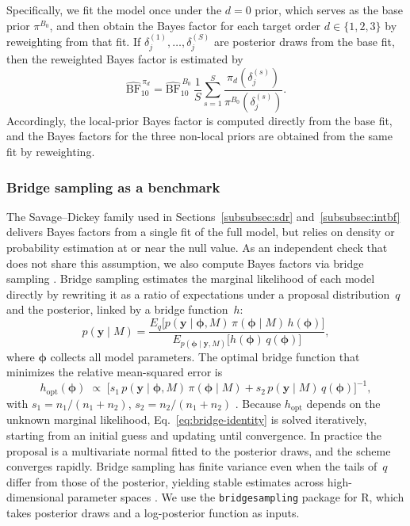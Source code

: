 \documentclass{article}
\begin{document}
Specifically, we fit the model once under the $d=0$ prior, which serves
as the base prior $\pi^{B_0}$, and then obtain the Bayes factor for each
target order $d \in \{1,2,3\}$ by reweighting from that fit. If
$\delta_j^{(1)},\dots,\delta_j^{(S)}$ are posterior draws from the base
fit, then the reweighted Bayes factor is estimated by
%
\begin{equation}
\label{eq:reweighting-estimator}
\widehat{\mathrm{BF}}^{\,\pi_d}_{10}
  = \widehat{\mathrm{BF}}^{\,B_0}_{10}\,
    \frac{1}{S}\sum_{s=1}^{S}
    \frac{\pi_d(\delta_j^{(s)})}{\pi^{B_0}(\delta_j^{(s)})}.
\end{equation}
%
Accordingly, the local-prior Bayes factor is computed directly from the
base fit, and the Bayes factors for the three non-local priors are
obtained from the same fit by reweighting.


\subsubsection{Bridge sampling as a benchmark\label{subsubsec:bridge}}

The Savage--Dickey family used in
Sections~\ref{subsubsec:sdr} and~\ref{subsubsec:intbf} delivers
Bayes factors from a single fit of the full model, but relies on
density or probability estimation at or near the null value.
As an independent check that does not share this assumption, we
also compute Bayes factors via bridge sampling
\parencite{Meng1996, Gronau2017}.
Bridge sampling estimates the marginal likelihood of each model
directly by rewriting it as a ratio of expectations under a
proposal distribution~$q$ and the posterior, linked by a bridge
function~$h$:
%
\begin{equation}
\label{eq:bridge-identity}
p(\mathbf{y}\mid M)
  = \frac{
      E_q\bigl[p(\mathbf{y}\mid\boldsymbol{\phi},M)\,
        \pi(\boldsymbol{\phi}\mid M)\,h(\boldsymbol{\phi})\bigr]}
    {E_{p(\boldsymbol{\phi}\mid\mathbf{y},M)}\bigl[
        h(\boldsymbol{\phi})\,q(\boldsymbol{\phi})\bigr]},
\end{equation}
%
where $\boldsymbol{\phi}$ collects all model parameters.
The optimal bridge function that minimizes the relative
mean-squared error is
\[
h_{\mathrm{opt}}(\boldsymbol{\phi})
  \;\propto\;
  \bigl[
    s_1\,p(\mathbf{y}\mid\boldsymbol{\phi},M)\,
      \pi(\boldsymbol{\phi}\mid M)
    + s_2\,p(\mathbf{y}\mid M)\,q(\boldsymbol{\phi})
  \bigr]^{-1},
\]
with $s_1=n_1/(n_1+n_2)$, $s_2=n_2/(n_1+n_2)$ \parencite{Meng1996}.
Because $h_{\mathrm{opt}}$ depends on the unknown marginal
likelihood, Eq.~\eqref{eq:bridge-identity} is solved iteratively,
starting from an initial guess and updating until convergence.
In practice the proposal is a multivariate normal fitted to the
posterior draws, and the scheme converges rapidly.
Bridge sampling has finite variance even when the tails of~$q$
differ from those of the posterior, yielding stable estimates
across high-dimensional parameter spaces \parencite{Gronau2017}.
We use the \texttt{bridgesampling} package for \textsf{R}, which
takes posterior draws and a log-posterior function as inputs.
\end{document}
